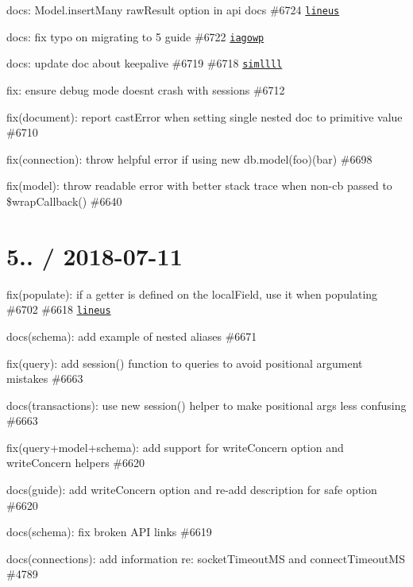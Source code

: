 \begin{DoxyItemize}
\item docs\+: Model.\+insert\+Many raw\+Result option in api docs \#6724 \href{https://github.com/lineus}{\tt lineus}
\item docs\+: fix typo on migrating to 5 guide \#6722 \href{https://github.com/iagowp}{\tt iagowp}
\item docs\+: update doc about keepalive \#6719 \#6718 \href{https://github.com/simllll}{\tt simllll}
\item fix\+: ensure debug mode doesn\textquotesingle{}t crash with sessions \#6712
\item fix(document)\+: report cast\+Error when setting single nested doc to primitive value \#6710
\item fix(connection)\+: throw helpful error if using {\ttfamily new db.\+model(foo)(bar)} \#6698
\item fix(model)\+: throw readable error with better stack trace when non-\/cb passed to \$wrap\+Callback() \#6640
\end{DoxyItemize}

\section*{5.. / 2018-\/07-\/11 }


\begin{DoxyItemize}
\item fix(populate)\+: if a getter is defined on the local\+Field, use it when populating \#6702 \#6618 \href{https://github.com/lineus}{\tt lineus}
\item docs(schema)\+: add example of nested aliases \#6671
\item fix(query)\+: add {\ttfamily session()} function to queries to avoid positional argument mistakes \#6663
\item docs(transactions)\+: use new session() helper to make positional args less confusing \#6663
\item fix(query+model+schema)\+: add support for {\ttfamily write\+Concern} option and write\+Concern helpers \#6620
\item docs(guide)\+: add {\ttfamily write\+Concern} option and re-\/add description for {\ttfamily safe} option \#6620
\item docs(schema)\+: fix broken A\+PI links \#6619
\item docs(connections)\+: add information re\+: socket\+Timeout\+MS and connect\+Timeout\+MS \#4789
\end{DoxyItemize}


